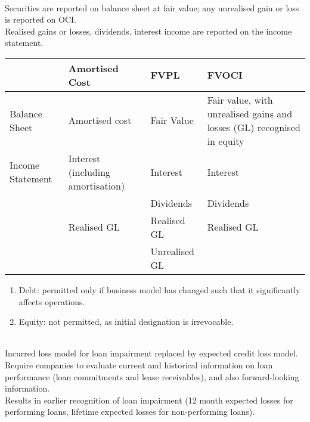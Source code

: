 \begin{method} \\
Securities are reported on balance sheet at fair value; any unrealised gain or loss is reported on OCI.\\
Realised gains or losses, dividends, interest income are reported on the income statement.
\end{method}

\begin{flushleft}
\begin{tabularx}{\textwidth}{p{5em}|p{14.5em}|X|p{16em}}
\hline
\rowcolor{gray!30}
 & Amortised Cost & FVPL & FVOCI \\
\hline
Balance Sheet & Amortised cost & Fair Value & Fair value, with unrealised gains and losses (GL) recognised in equity \\
\hline
Income Statement & Interest (including amortisation) & Interest & Interest \\
& & Dividends & Dividends \\
& Realised GL & Realised GL & Realised GL \\
& & Unrealised GL & \\
\hline
\end{tabularx}
\end{flushleft}

\begin{method} 
\begin{enumerate}[label=\roman*.]
\setlength{\itemsep}{0pt}
\item Debt: permitted only if business model has changed such that it significantly affects operations.
\item Equity: not permitted, as initial designation is irrevocable.
\end{enumerate}
\end{method}

\begin{method} \\
Incurred loss model for loan impairment replaced by expected credit loss model. Require companies to evaluate current and historical information on loan performance (loan commitments and lease receivables), and also forward-looking information.\\
Results in earlier recognition of loan impairment (12 month expected losses for performing loans, lifetime expected losses for non-performing loans).
\end{method}

